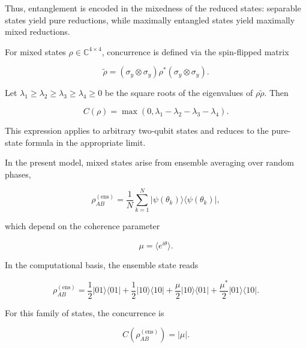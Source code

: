 Thus, entanglement is encoded in the mixedness of the reduced states: separable states yield pure reductions, while maximally entangled states yield maximally mixed reductions.

\medskip

For mixed states \( \rho \in \mathbb{C}^{4 \times 4} \), concurrence is defined via the spin-flipped matrix

\begin{equation}
\tilde{\rho}
=
(\sigma_y \otimes \sigma_y)
\rho^*
(\sigma_y \otimes \sigma_y).
\label{eq:spin_flipped_density_matrix}
\end{equation}

Let \( \lambda_1 \ge \lambda_2 \ge \lambda_3 \ge \lambda_4 \ge 0 \) be the square roots of the eigenvalues of \( \rho\tilde{\rho} \). Then

\begin{equation}
C(\rho)
=
\max
\left(
0,
\lambda_1-\lambda_2-\lambda_3-\lambda_4
\right).
\label{eq:mixed_state_concurrence}
\end{equation}

This expression applies to arbitrary two-qubit states and reduces to the pure-state formula in the appropriate limit.

\medskip

In the present model, mixed states arise from ensemble averaging over random phases,

\[
\rho_{AB}^{(\mathrm{ens})}
=
\frac{1}{N}
\sum_{k=1}^{N}
|\psi(\theta_k)\rangle\langle\psi(\theta_k)|,
\]

which depend on the coherence parameter

\[
\mu
=
\langle e^{i\theta}\rangle.
\]

In the computational basis, the ensemble state reads

\begin{equation}
\rho_{AB}^{(\mathrm{ens})}
=
\frac{1}{2}|01\rangle\langle 01|
+
\frac{1}{2}|10\rangle\langle 10|
+
\frac{\mu}{2}|10\rangle\langle 01|
+
\frac{\mu^*}{2}|01\rangle\langle 10|.
\label{eq:random_phase_ensemble_density_explicit}
\end{equation}

For this family of states, the concurrence is

\begin{equation}
C
\left(
\rho_{AB}^{(\mathrm{ens})}
\right)
=
|\mu|.
\label{eq:random_phase_ensemble_concurrence}
\end{equation}

\medskip

